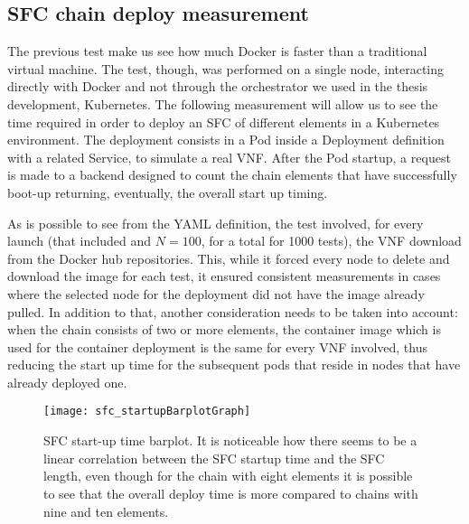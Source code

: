

\subsection{SFC chain deploy measurement}

The previous test make us see how much Docker is faster than a traditional
virtual machine. The test, though, was performed on a single node, interacting
directly with Docker and not through the orchestrator we used in the thesis
development, Kubernetes. The following measurement will allow us to see the time
required in order to deploy an SFC of different elements in a Kubernetes
environment. The deployment consists in a Pod inside a Deployment definition
with a related Service, to simulate a real VNF. After the Pod startup, a request
is made to a backend designed to count the chain elements that have successfully
boot-up returning, eventually, the overall start up timing.



\vspace{0.5cm}

\noindent As is possible to see from the YAML definition, the test involved, for
every launch (that included and $N = 100$, for a total for 1000 tests), the VNF
download from the Docker hub repositories. This, while it forced every node to
delete and download the image for each test, it ensured consistent measurements
in cases where the selected node for the deployment did not have the image
already pulled. In addition to that, another consideration needs to be taken
into account: when the chain consists of two or more elements, the container
image which is used for the container deployment is the same for every VNF
involved, thus reducing the start up time for the subsequent pods that reside in
nodes that have already deployed one.

\begin{figure}[t]
  \centering
  \texttt{[image: sfc\_startupBarplotGraph]}
  \caption[SFC start-up time barplot]{SFC start-up time barplot. It is
    noticeable how there seems to be a linear correlation between the SFC
    startup time and the SFC length, even though for the chain with eight
    elements it is possible to see that the overall deploy time is more compared
    to chains with nine and ten elements.}
  \label{chap:tests:sec:sfclength:img:barplot}
\end{figure}

